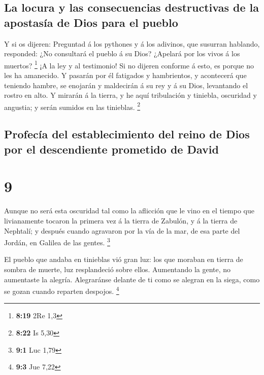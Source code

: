 \hypertarget{la-locura-y-las-consecuencias-destructivas-de-la-apostasuxeda-de-dios-para-el-pueblo}{%
\subsection{La locura y las consecuencias destructivas de la apostasía
de Dios para el
pueblo}\label{la-locura-y-las-consecuencias-destructivas-de-la-apostasuxeda-de-dios-para-el-pueblo}}

 Y si os dijeren: Preguntad á los pythones y á los
adivinos, que susurran hablando, responded: ¿No consultará el pueblo á
su Dios? ¿Apelará por los vivos á los muertos? \footnote{\textbf{8:19}
  2Re 1,3}  ¡A la ley y al testimonio! Si no dijeren
conforme á esto, es porque no les ha amanecido.  Y pasarán
por él fatigados y hambrientos, y acontecerá que teniendo hambre, se
enojarán y maldecirán á su rey y á su Dios, levantando el rostro en
alto.  Y mirarán á la tierra, y he aquí tribulación y
tiniebla, oscuridad y angustia; y serán sumidos en las tinieblas.
\footnote{\textbf{8:22} Is 5,30}

\hypertarget{profecuxeda-del-establecimiento-del-reino-de-dios-por-el-descendiente-prometido-de-david}{%
\subsection{Profecía del establecimiento del reino de Dios por el
descendiente prometido de
David}\label{profecuxeda-del-establecimiento-del-reino-de-dios-por-el-descendiente-prometido-de-david}}

\hypertarget{section-8}{%
\section{9}\label{section-8}}

 Aunque no será esta oscuridad tal como la aflicción que le
vino en el tiempo que livianamente tocaron la primera vez á la tierra de
Zabulón, y á la tierra de Nephtalí; y después cuando agravaron por la
vía de la mar, de esa parte del Jordán, en Galilea de las gentes.
\footnote{\textbf{9:1} Luc 1,79}

 El pueblo que andaba en tinieblas vió gran luz: los que
moraban en tierra de sombra de muerte, luz resplandeció sobre ellos.
 Aumentando la gente, no aumentaste la alegría. Alegraránse
delante de ti como se alegran en la siega, como se gozan cuando reparten
despojos. \footnote{\textbf{9:3} Jue 7,22}

